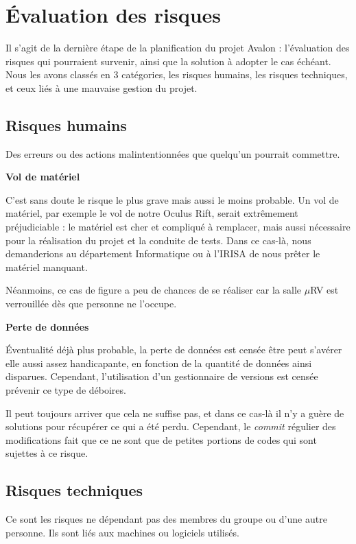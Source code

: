 \section{Évaluation des risques}

Il s'agit de la dernière étape de la planification du projet Avalon : l’évaluation des risques qui pourraient survenir, ainsi que la solution à adopter le cas échéant. Nous les avons classés en 3 catégories, les risques humains, les risques techniques, et ceux liés à une mauvaise gestion du projet. 

\subsection{Risques humains}
Des erreurs ou des actions malintentionnées que quelqu'un pourrait commettre. 

\textbf{Vol de matériel}

C'est sans doute le risque le plus grave mais aussi le moins probable. Un vol de matériel, par exemple le vol de notre Oculus Rift, serait extrêmement préjudiciable : le matériel est cher et compliqué à remplacer, mais aussi nécessaire pour la réalisation du projet et la conduite de tests. Dans ce cas-là, nous demanderions au département Informatique ou à l'IRISA de nous prêter le matériel manquant.

Néanmoins, ce cas de figure a peu de chances de se réaliser car la salle $\mu$RV est verrouillée dès que personne ne l'occupe.

\textbf{Perte de données}

Éventualité déjà plus probable, la perte de données est censée être peut s'avérer elle aussi assez handicapante, en fonction de la quantité de données ainsi disparues. Cependant, l'utilisation d'un gestionnaire de versions est censée prévenir ce type de déboires.

Il peut toujours arriver que cela ne suffise pas, et dans ce cas-là il n'y a guère de solutions pour récupérer ce qui a été perdu. Cependant, le \emph{commit} régulier des modifications fait que ce ne sont que de petites portions de codes qui sont sujettes à ce risque.

\subsection{Risques techniques}
Ce sont les risques ne dépendant pas des membres du groupe ou d'une autre personne. Ils sont liés aux machines ou logiciels utilisés.

